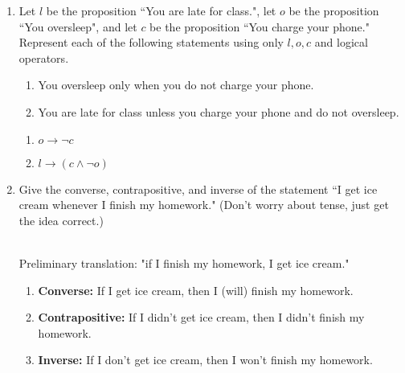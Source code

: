 \begin{enumerate}

















    
    
    
    
    \item Let $l$ be the proposition ``You are late for class.", let $o$ be the proposition ``You oversleep", and let $c$ be the proposition ``You charge your phone." Represent each of the following statements using only $l, o, c$ and logical operators. 
    
    \begin{enumerate}
        \item You oversleep only when you do not charge your phone.
        \item You are late for class unless you charge your phone and do not oversleep.
    \end{enumerate}
    
    \begin{solution}
    \begin{enumerate}
        \item $o \rightarrow \neg c$
        \item $l \rightarrow (c \land \neg o)$
    \end{enumerate}
    \end{solution}
    
    \item Give the converse, contrapositive, and inverse of the statement ``I get ice cream whenever I finish my homework." (Don't worry about tense, just get the idea correct.) 
    
    \begin{solution}\\
    Preliminary translation: "if I finish my homework, I get ice cream."
    \begin{enumerate}
        \item \textbf{Converse:} If I get ice cream, then I (will) finish my homework. 
        \item \textbf{Contrapositive:} If I didn't get ice cream, then I didn't finish my homework.
        \item \textbf{Inverse:} If I don't get ice cream, then I won't finish my homework.
    \end{enumerate}
    \end{solution}
    

\end{enumerate}
